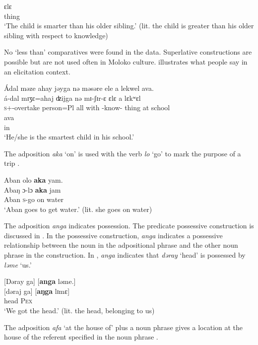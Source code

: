       \medskip
\gll ɛlɛ\\
     thing\\
\glt  ‘The child is smarter than his older sibling.’ (lit. the child is greater than his older sibling with respect to knowledge)
\z

No ‘less than’ comparatives were found in the data. Superlative constructions are possible but are not used often in Moloko culture.   illustrates what people say in an elicitation context.

\ea \label{ex:5:131}
Ádal  məze  ahay  jəyga  nə  məsəre  ele  a  lekwel  ava.\\
\gll  á-dal     mɪʒɛ=ahaj   ʣijga   nə  mɪ{}-ʃɪr-ɛ    ɛlɛ  a  lɛkʷɛl \\ 
      \textsc{s}+{\IFV}-overtake  person=Pl  all  with  {\NOM}{}-know-{\CL}  thing  at  school\\  
      
      \medskip
\gll ava\\
     in\\     
\glt  ‘He/she is the smartest child in his school.’
\z

The adposition \textit{aka}  ‘on’ is used with the verb \textit{lo} ‘go’ to mark the purpose of a trip .

\ea \label{ex:5:132}
Aban  olo  \textbf{aka}  yam.\\
\gll  Abaŋ  ɔ{}-lɔ   \textbf{aka}   jam\\
      Aban  \textsc{s}-go  on  water\\
\glt  ‘Aban goes to get water.’ (lit. she goes on water)
\z

The adposition \textit{anga} indicates possession. The predicate possessive construction is discussed in . In the possessive construction, \textit{anga} indicates a possessive relationship between the noun in the adpositional phrase and the other noun phrase in the construction. In , \textit{anga}  indicates that \textit{dəray} ‘head’ is possessed by \textit{ləme} ‘us.’

\ea \label{ex:5:133}
{}[Dəray  ga]  [\textbf{anga}  ləme.]\\
\gll  {}[dəraj  ga]    [\textbf{aŋga}  lɪmɛ]\\
      head  {\ADJ}    {\POSS}  \textsc{Pex}\\
\glt  ‘We got the head.’ (lit. the head, belonging to us)
\z

The adposition \textit{afa} ‘at the house of’ plus a noun phrase gives a location at the house of the referent specified in the noun phrase . 

